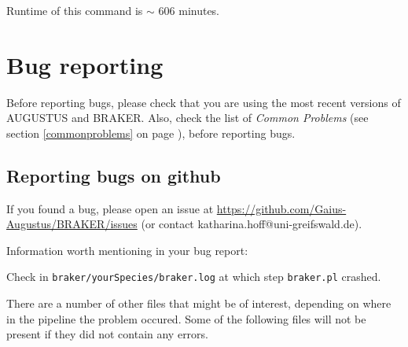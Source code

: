 \documentclass[a4paper,10pt]{report}
\begin{document}
Runtime of this command is $\sim$ 606 minutes.

\chapter{Bug reporting}

Before reporting bugs, please check that you are using the most recent versions of AUGUSTUS and BRAKER. Also, check the list of \textit{Common Problems} (see section \ref{commonproblems} on page \pageref{commonproblems}), before reporting bugs.

\section{Reporting bugs on github}

If you found a bug, please open an issue at \url{https://github.com/Gaius-Augustus/BRAKER/issues} (or contact katharina.hoff@uni-greifswald.de).

Information worth mentioning in your bug report:

Check in \texttt{braker/yourSpecies/braker.log} at which step \texttt{braker.pl} crashed.

There are a number of other files that might be of interest, depending on where in the pipeline the
problem occured. Some of the following files will not be present if they did not contain any errors.
\end{document}
